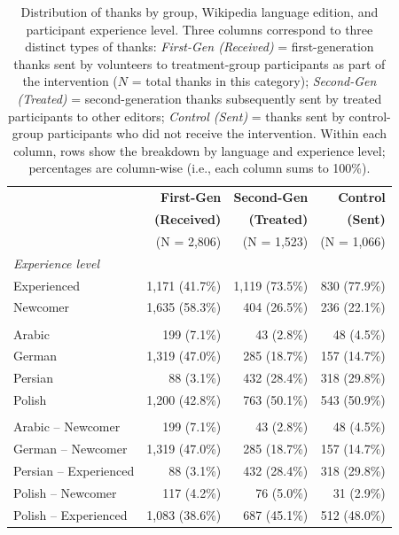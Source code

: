 \documentclass[9pt,twoside,lineno]{pnas-new}
\begin{document}
\clearpage
\begin{table}[t]
\centering
\caption{Distribution of thanks by group, Wikipedia language edition, and participant experience level. Three columns correspond to three distinct types of thanks: \textit{First-Gen (Received)} = first-generation thanks sent by volunteers to treatment-group participants as part of the intervention ($N$ = total thanks in this category); \textit{Second-Gen (Treated)} = second-generation thanks subsequently sent by treated participants to other editors; \textit{Control (Sent)} = thanks sent by control-group participants who did not receive the intervention. Within each column, rows show the breakdown by language and experience level; percentages are column-wise (i.e., each column sums to 100\%).}
\label{table:thanks-distribution}
\begin{tabular}{lrrr}
\toprule
 & \textbf{First-Gen} & \textbf{Second-Gen} & \textbf{Control} \\
 & \textbf{(Received)} & \textbf{(Treated)} & \textbf{(Sent)} \\
 & (N = 2,806) & (N = 1,523) & (N = 1,066) \\
\midrule
\multicolumn{4}{l}{\textit{Experience level}} \\
\quad Experienced & 1,171 (41.7\%) & 1,119 (73.5\%) & 830 (77.9\%) \\
\quad Newcomer & 1,635 (58.3\%) & 404 (26.5\%) & 236 (22.1\%) \\
\addlinespace
\multicolumn{4}{l}{\textit{Language}} \\
\quad Arabic & 199 (7.1\%) & 43 (2.8\%) & 48 (4.5\%) \\
\quad German & 1,319 (47.0\%) & 285 (18.7\%) & 157 (14.7\%) \\
\quad Persian & 88 (3.1\%) & 432 (28.4\%) & 318 (29.8\%) \\
\quad Polish & 1,200 (42.8\%) & 763 (50.1\%) & 543 (50.9\%) \\
\addlinespace
\multicolumn{4}{l}{\textit{Language $\times$ Experience}} \\
\quad Arabic -- Newcomer & 199 (7.1\%) & 43 (2.8\%) & 48 (4.5\%) \\
\quad German -- Newcomer & 1,319 (47.0\%) & 285 (18.7\%) & 157 (14.7\%) \\
\quad Persian -- Experienced & 88 (3.1\%) & 432 (28.4\%) & 318 (29.8\%) \\
\quad Polish -- Newcomer & 117 (4.2\%) & 76 (5.0\%) & 31 (2.9\%) \\
\quad Polish -- Experienced & 1,083 (38.6\%) & 687 (45.1\%) & 512 (48.0\%) \\
\bottomrule
\end{tabular}
\end{table}
\end{document}
